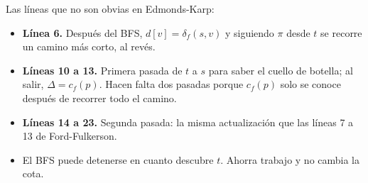 \documentclass[11pt,letterpaper]{article}
\begin{document}
Las líneas que no son obvias en Edmonds-Karp:
\begin{itemize}[beginpenalty=10000]
  \item \textbf{Línea 6.} Después del BFS, $d[v] = \delta_f(s, v)$ y
        siguiendo $\pi$ desde $t$ se recorre un camino más corto, al
        revés.
  \item \textbf{Líneas 10 a 13.} Primera pasada de $t$ a $s$ para
        saber el cuello de botella; al salir, $\Delta = c_f(p)$. Hacen
        falta dos pasadas porque $c_f(p)$ solo se conoce después de
        recorrer todo el camino.
  \item \textbf{Líneas 14 a 23.} Segunda pasada: la misma
        actualización que las líneas 7 a 13 de Ford-Fulkerson.
  \item El BFS puede detenerse en cuanto descubre $t$. Ahorra trabajo
        y no cambia la cota.
\end{itemize}
\end{document}

